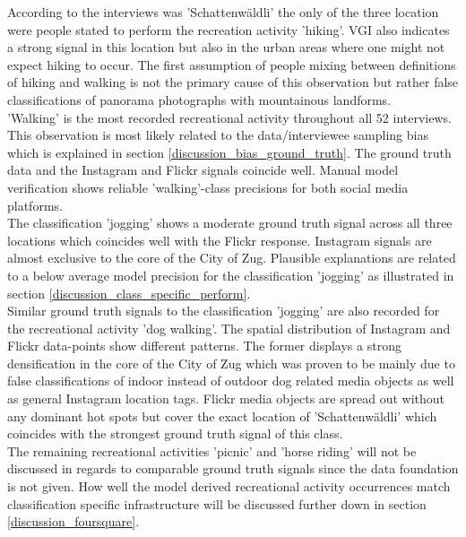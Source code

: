 According to the interviews was 'Schattenw\"aldli' the only of the three location were people stated to perform the recreation activity 'hiking'. VGI also indicates a strong signal in this location but also in the urban areas where one might not expect hiking to occur. The first assumption of people mixing between definitions of hiking and walking is not the primary cause of this observation but rather false classifications of panorama photographs with mountainous landforms. \\

'Walking' is the most recorded recreational activity throughout all 52 interviews. This observation is most likely related to the data/interviewee sampling bias which is explained in section \ref{discussion_bias_ground_truth}. The ground truth data and the Instagram and Flickr signals coincide well. Manual model verification shows reliable 'walking'-class precisions for both social media platforms.\\

The classification 'jogging' shows a moderate ground truth signal across all three locations which coincides well with the Flickr response. Instagram signals are almost exclusive to the core of the City of Zug. Plausible explanations are related to a below average model precision for the classification 'jogging' as illustrated in section \ref{discussion_class_specific_perform}. \\

Similar ground truth signals to the classification 'jogging' are also recorded for the recreational activity 'dog walking'. The spatial distribution of Instagram and Flickr data-points show different patterns. The former displays a strong densification in the core of the City of Zug which was proven to be mainly due to false classifications of indoor instead of outdoor dog related media objects as well as general Instagram location tags. Flickr media objects are spread out without any dominant hot spots but cover the exact location of 'Schattenw\"aldli' which coincides with the strongest ground truth signal of this class. \\

The remaining recreational activities 'picnic' and 'horse riding' will not be discussed in regards to comparable ground truth signals since the data foundation is not given. How well the model derived recreational activity occurrences match classification specific infrastructure will be discussed further down in section \ref{discussion_foursquare}.\\


